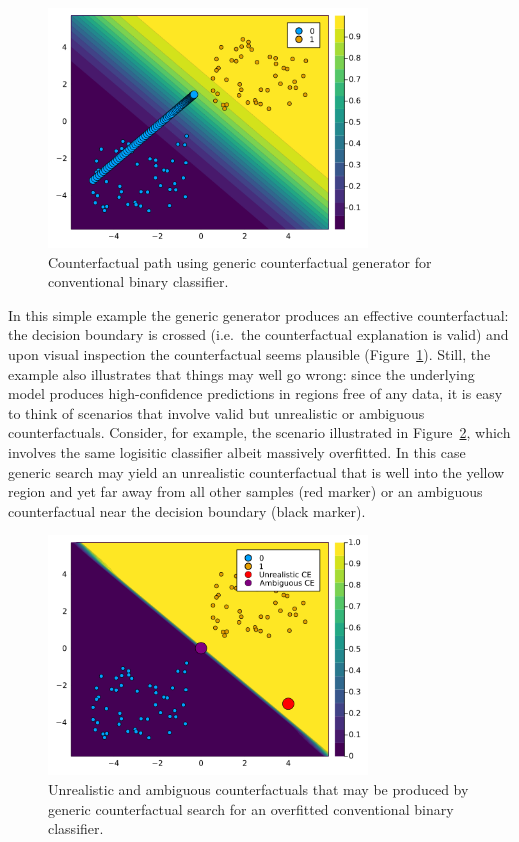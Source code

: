 \documentclass{juliacon}
\begin{document}
\begin{figure}

{\centering \includegraphics[width=3.33333in,height=2.5in]{www/ce_binary.png}

}

\caption{\label{fig-binary}Counterfactual path using generic
counterfactual generator for conventional binary classifier.}

\end{figure}

In this simple example the generic generator produces an effective
counterfactual: the decision boundary is crossed (i.e.~the
counterfactual explanation is valid) and upon visual inspection the
counterfactual seems plausible (Figure~\ref{fig-binary}). Still, the
example also illustrates that things may well go wrong: since the
underlying model produces high-confidence predictions in regions free of
any data, it is easy to think of scenarios that involve valid but
unrealistic or ambiguous counterfactuals. Consider, for example, the
scenario illustrated in Figure~\ref{fig-binary-wrong}, which involves
the same logisitic classifier albeit massively overfitted. In this case
generic search may yield an unrealistic counterfactual that is well into
the yellow region and yet far away from all other samples (red marker)
or an ambiguous counterfactual near the decision boundary (black
marker).

\begin{figure}

{\centering \includegraphics[width=3.33333in,height=2.5in]{www/binary_wrong.png}

}

\caption{\label{fig-binary-wrong}Unrealistic and ambiguous
counterfactuals that may be produced by generic counterfactual search
for an overfitted conventional binary classifier.}

\end{figure}
\end{document}
